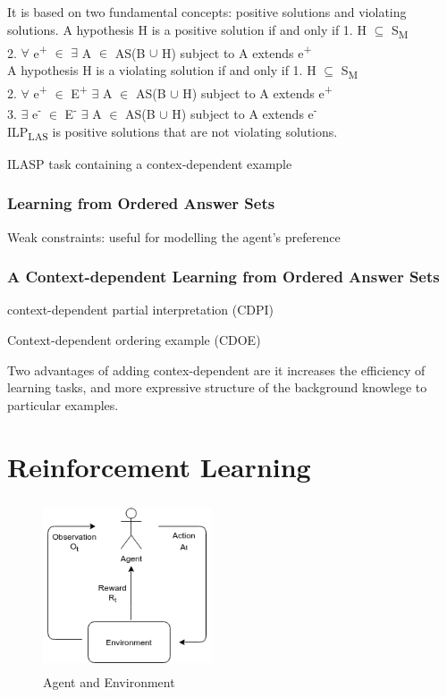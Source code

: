 \documentclass[12pt,twoside]{report}
\begin{document}
It is based on two fundamental concepts: positive solutions and violating solutions.
A hypothesis H is a positive solution if and only if
1. H $\subseteq$ S\textsubscript{M} \\
2. $\forall$ e\textsuperscript{+} $\in$ $\exists$ A $\in$ AS(B $\cup$ H) subject to A extends e\textsuperscript{+}\\

A hypothesis H is a violating solution if and only if
1. H $\subseteq$ S\textsubscript{M} \\
2. $\forall$ e\textsuperscript{+} $\in$ E\textsuperscript{+} $\exists$ A $\in$ AS(B $\cup$ H) subject to A extends e\textsuperscript{+}\\
3. $\exists$ e\textsuperscript{-} $\in$ E\textsuperscript{-} $\exists$ A $\in$ AS(B $\cup$ H) subject to A extends e\textsuperscript{-}\\


ILP\textsubscript{LAS} is positive solutions that are not violating solutions.

ILASP task containing a contex-dependent example

\subsubsection{Learning from Ordered Answer Sets}

Weak constraints: useful for modelling the agent's preference



\subsubsection{A Context-dependent Learning from Ordered Answer Sets}


context-dependent partial interpretation (CDPI)


Context-dependent ordering example (CDOE)

Two advantages of adding contex-dependent are it increases the efficiency of learning tasks, and more expressive structure of the background knowlege to particular examples.


\section{Reinforcement Learning}
\label{rl}

\begin{figure}[!htb]
\centering
\includegraphics[width=5cm, height=5cm]{./figures/agent_env}
\caption{Agent and Environment}
\label{agent_env}
\end{figure}
\end{document}
